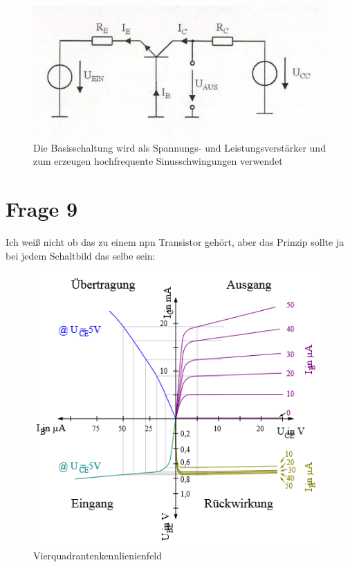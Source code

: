\begin{figure}[h]
	\centering
	\includegraphics[scale=0.5]{Basisschaltung.jpg}
	\caption{Die Basisschaltung wird als Spannungs- und Leistungsverstärker und zum erzeugen hochfrequente Sinusschwingungen verwendet}
\end{figure}


\newpage


\section{Frage 9}


Ich weiß nicht ob das zu einem npn Transistor gehört, aber das Prinzip sollte ja bei jedem Schaltbild das selbe sein:

\begin{figure}[h]
	\centering
	\includegraphics[scale=0.5]{Kombiniertes_Kennlinienfeld_Transistor.png}
	\caption{Vierquadrantenkennlienienfeld}
\end{figure}

